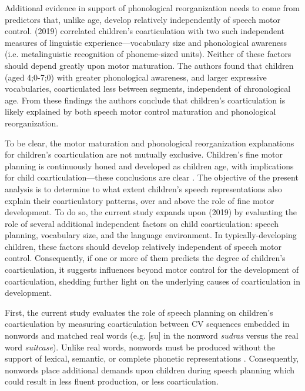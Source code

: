 \documentclass[a4paper,man,natbib,donotrepeattitle, apacite]{apa6}
\begin{document}
Additional evidence in support of phonological reorganization needs to come from predictors that, unlike age, develop relatively independently of speech motor control. \citeauthor{noiraySpokenLanguageDevelopment2019} (2019) correlated children’s coarticulation with two such independent measures of linguistic experience---vocabulary size and phonological awareness (i.e. metalinguistic recognition of phoneme-sized units). Neither of these factors should depend greatly upon motor maturation. The authors found that children (aged 4;0-7;0)  with greater phonological awareness, and larger expressive vocabularies, coarticulated less between segments, independent of chronological age. From these findings the authors conclude that children’s coarticulation is likely explained by both speech motor control maturation and phonological reorganization. 

To be clear, the motor maturation and phonological reorganization explanations for children’s coarticulation are not mutually exclusive. Children’s fine motor planning is continuously honed and developed as children age, with implications for child coarticulation---these conclusions are clear \cite{barbierWhatAnticipatoryCoarticulation2020,rubertusDevelopmentGesturalOrganization2018,zharkovaDynamicsVoicelessSibilant2018}. The objective of the present analysis is to determine to what extent children’s speech representations also explain their coarticulatory patterns, over and above the role of fine motor development. To do so, the current study expands upon \citeauthor{noiraySpokenLanguageDevelopment2019} (2019) by evaluating the role of several additional independent factors on child coarticulation: speech planning, vocabulary size, and the language environment. In typically-developing children, these factors should develop relatively independent of speech motor control. Consequently, if one or more of them predicts the degree of children’s coarticulation, it suggests influences beyond motor control for the development of coarticulation, shedding further light on the underlying causes of coarticulation in development. 

First, the current study evaluates the role of speech planning on children’s coarticulation by measuring coarticulation between CV sequences embedded in nonwords and matched real words (e.g. [su] in the nonword \textit{sudras} versus the real word \textit{suitcase}). Unlike real words, nonwords must be produced without the support of lexical, semantic, or complete phonetic representations \cite{chiatPreschoolRepetitionTest2007,cychoszLexicalAdvantageFouryearold2020,gathercoleInfluencesNumberSyllables1991,keren-portnoyRoleVocalPractice2010}. Consequently, nonwords place additional demands upon children during speech planning which could result in less fluent production, or less coarticulation.
\end{document}
